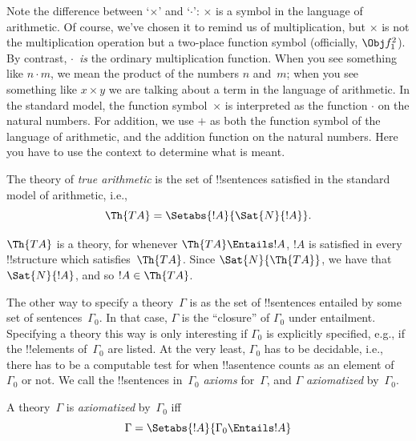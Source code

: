 \documentclass[../../../include/open-logic-section]{subfiles}
\begin{document}
Note the difference between `$\times$' and `$\cdot$': $\times$ is a
symbol in the language of arithmetic. Of course, we've chosen it to
remind us of multiplication, but $\times$ is not the multiplication
operation but a two-place function symbol (officially, $\Obj f^2_1$).
By contrast, $\cdot$~\emph{is} the ordinary multiplication function.
When you see something like $n \cdot m$, we mean the product of the
numbers $n$ and~$m$; when you see something like $x \times y$ we are
talking about a term in the language of arithmetic. In the standard
model, the function symbol~$\times$ is interpreted as the function
$\cdot$ on the natural numbers. For addition, we use $+$ as both the
function symbol of the language of arithmetic, and the addition
function on the natural numbers. Here you have to use the context to
determine what is meant.

\begin{defn}
The theory of \emph{true arithmetic} is the set of !!{sentence}s
satisfied in the standard model of arithmetic, i.e.,
\[
\Th{TA} = \Setabs{!A}{\Sat{N}{!A}}.
\]
\end{defn}

$\Th{TA}$ is a theory, for whenever $\Th{TA} \Entails !A$, $!A$ is
satisfied in every !!{structure} which satisfies~$\Th{TA}$. Since
$\Sat{N}{\Th{TA}}$, we have that~$\Sat{N}{!A}$, and so $!A \in \Th{TA}$.

The other way to specify a theory~$\Gamma$ is as the set of
!!{sentence}s entailed by some set of sentences~$\Gamma_0$. In that
case, $\Gamma$ is the ``closure'' of $\Gamma_0$ under entailment.
Specifying a theory this way is only interesting if $\Gamma_0$ is
explicitly specified, e.g., if the !!{element}s of~$\Gamma_0$ are
listed. At the very least, $\Gamma_0$ has to be decidable, i.e., there
has to be a computable test for when !!a{sentence} counts as an
element of~$\Gamma_0$ or not. We call the !!{sentence}s
in~$\Gamma_0$ \emph{axioms} for~$\Gamma$, and $\Gamma$
\emph{axiomatized} by~$\Gamma_0$.

\begin{defn}
A theory~$\Gamma$ is \emph{axiomatized} by~$\Gamma_0$ iff
\[
\Gamma = \Setabs{!A}{\Gamma_0 \Entails !A}
\]
\end{defn}
\end{document}
